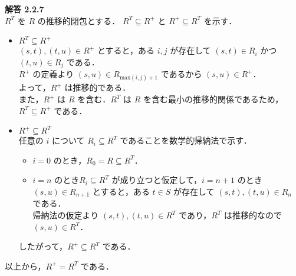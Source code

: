\documentclass[a4paper,11pt,fleqn,dvipdfmx]{article}
\newcommand{\ansja}[1]{\noindent\textbf{解答 #1}\\[2mm]}
\newcommand{\qed}[0]{\hfill\fbox{}}
\begin{document}
    \pagebreak

    \ansja{2.2.7}
        $R^{T}$ を $R$ の推移的閉包とする． $R^{T} \subseteq R^{+}$ と $R^{+} \subseteq R^{T}$ を示す．
        \begin{itemize}
            \item $R^{T} \subseteq R^{+}$ \\[2mm]
            $(s,t),(t,u) \in R^{+}$ とすると，ある $i,j$ が存在して $(s,t) \in R_i$ かつ $(t,u) \in R_j$ である． \\
            $R^{+}$ の定義より $(s,u) \in R_{\mathrm{max}(i,j)+1}$ であるから $(s,u) \in R^{+}$． \\
            よって，$R^{+}$ は推移的である． \\
            また，$R^{+}$ は $R$ を含む．$R^{T}$ は $R$ を含む最小の推移的関係であるため，$R^{T} \subseteq R^{+}$ である．
            \item $R^{+} \subseteq R^{T}$ \\[2mm]
            任意の $i$ について $R_i \subseteq R^{T}$ であることを数学的帰納法で示す．
            \begin{itemize}
                \item $i=0$ のとき，$R_0 = R \subseteq R^{T}$．
                \item $i=n$ のとき$R_i \subseteq R^{T}$ が成り立つと仮定して，$i=n+1$ のとき \\
                $(s,u) \in R_{n+1}$ とすると，ある $t \in S$ が存在して $(s,t),(t,u) \in R_n$ である． \\
                帰納法の仮定より $(s,t),(t,u) \in R^{T}$ であり，$R^{T}$ は推移的なので $(s,u) \in R^{T}$．
            \end{itemize}
            したがって，$R^{+} \subseteq R^{T}$ である．
        \end{itemize}
        以上から，$R^{+} = R^{T}$ である．\qed

    \vspace{10mm}
\end{document}
